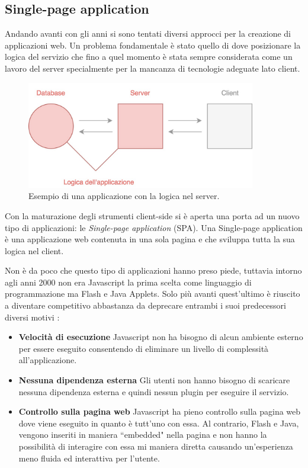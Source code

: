 \subsection{Single-page application}
Andando avanti con gli anni si sono tentati diversi approcci per la creazione di applicazioni web. Un problema fondamentale è stato quello di dove posizionare la logica del servizio che fino a quel momento è stata sempre considerata come un lavoro del server specialmente per la mancanza di tecnologie adeguate lato client.

\begin{figure}[h]
\centering
\includegraphics[width=10cm]{./images/noSPA}
\caption{Esempio di una applicazione con la logica nel server.}
\end{figure}

Con la maturazione degli strumenti client-side si è aperta una porta ad un nuovo tipo di applicazioni: le \textit{Single-page application} (SPA). Una Single-page application è una applicazione web contenuta in una sola pagina e che sviluppa tutta la sua logica nel client.

Non è da poco che questo tipo di applicazioni hanno preso piede, tuttavia intorno agli anni 2000 non era Javascript la prima scelta come linguaggio di programmazione ma Flash e Java Applets. Solo più avanti quest'ultimo è riuscito a diventare competitivo abbastanza da deprecare entrambi i suoi predecessori diversi motivi \cite{mikowski2013single}:

\begin{itemize}
    \item \textbf{Velocità di esecuzione} Javascript non ha bisogno di alcun ambiente esterno per essere eseguito consentendo di eliminare un livello di complessità all'applicazione.
    \item \textbf{Nessuna dipendenza esterna} Gli utenti non hanno bisogno di scaricare nessuna dipendenza esterna e quindi nessun plugin per eseguire il servizio.
    \item \textbf{Controllo sulla pagina web} Javascript ha pieno controllo sulla pagina web dove viene eseguito in quanto è tutt'uno con essa. Al contrario, Flash e Java, vengono inseriti in maniera “embedded" nella pagina e non hanno la possibilità di interagire con essa mi maniera diretta causando un'esperienza meno fluida ed interattiva per l'utente.
\end{itemize}

